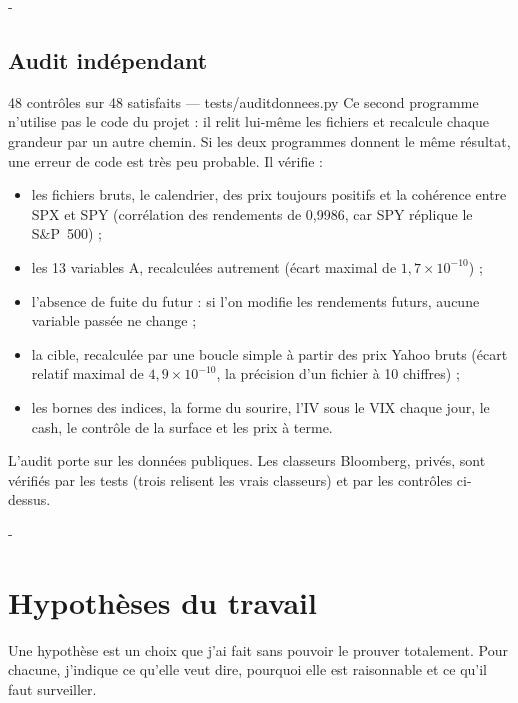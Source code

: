 \documentclass[10pt,a4paper]{article}
\makeatletter
\newcommand{\besoin}[1]{\par\penalty-100\begingroup\setlength{\dimen@}{#1}%
  \dimen@ii\pagegoal\advance\dimen@ii-\pagetotal
  \ifdim\dimen@>\dimen@ii\ifdim\dimen@ii>\z@\vfil\fi\break\fi\endgroup}
\let\sectionorigine\section
\renewcommand{\section}{\besoin{6\baselineskip}\sectionorigine}
\let\soussectionorigine\subsection
\renewcommand{\subsection}{\besoin{5\baselineskip}\soussectionorigine}
\newcommand{\coupure}{\textunderscore\allowbreak}
\newcommand{\fic}[1]{{\small\ttfamily\let\_\coupure #1}}
\makeatother
\begin{document}
\subsection{Audit indépendant}
\begin{valide}{48 contrôles sur 48 satisfaits — \fic{tests/audit\_donnees.py}}
Ce second programme n'utilise pas le code du projet : il relit lui-même les fichiers et recalcule chaque grandeur par un autre chemin. Si les deux programmes donnent le même résultat, une erreur de code est très peu probable. Il vérifie :
\begin{itemize}
\item les fichiers bruts, le calendrier, des prix toujours positifs et la cohérence entre SPX et SPY (corrélation des rendements de 0,9986, car SPY réplique le S\&P~500) ;
\item les 13 variables A, recalculées autrement (écart maximal de $1{,}7\times10^{-10}$) ;
\item l'absence de fuite du futur : si l'on modifie les rendements futurs, aucune variable passée ne change ;
\item la cible, recalculée par une boucle simple à partir des prix Yahoo bruts (écart relatif maximal de $4{,}9\times10^{-10}$, la précision d'un fichier à 10 chiffres) ;
\item les bornes des indices, la forme du sourire, l'IV sous le VIX chaque jour, le cash, le contrôle de la surface et les prix à terme.
\end{itemize}
L'audit porte sur les données publiques. Les classeurs Bloomberg, privés, sont vérifiés par les tests (trois relisent les vrais classeurs) et par les contrôles ci-dessus.
\end{valide}

\section{Hypothèses du travail}\label{sec:hypotheses}
Une hypothèse est un choix que j'ai fait sans pouvoir le prouver totalement. Pour chacune, j'indique ce qu'elle veut dire, pourquoi elle est raisonnable et ce qu'il faut surveiller.
\end{document}
